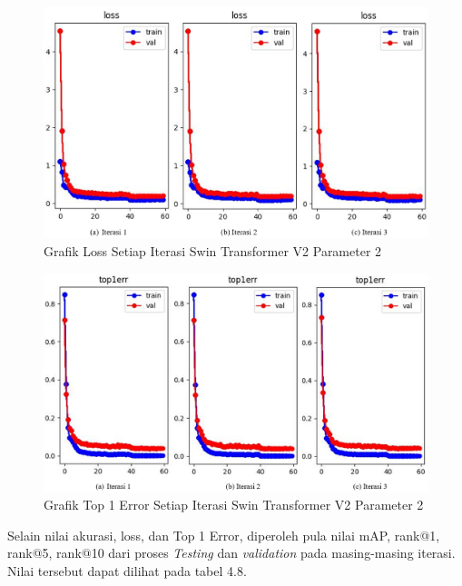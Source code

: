 \begin{figure}[ht]
  \centering
  \includegraphics[scale=0.55]{gambar/Train SwinV2CP1 Loss.png}
  \caption{Grafik Loss Setiap Iterasi Swin Transformer V2 Parameter 2}
  \label{fig:grafiklossdariswinv2parameter2}
\end{figure}

\begin{figure}[ht]
  \centering
  \includegraphics[scale=0.55]{gambar/Train SwinV2CP1 Top1Err.png}
  \caption{Grafik Top 1 Error Setiap Iterasi Swin Transformer V2 Parameter 2}
  \label{fig:grafiktop1errdariswinv2parameter2}
\end{figure}

Selain nilai akurasi, loss, dan Top 1 Error, diperoleh pula nilai mAP, rank@1, 
rank@5, rank@10 dari proses \emph{Testing} dan \emph{validation} pada 
masing-masing iterasi. Nilai tersebut dapat dilihat pada tabel 4.8.\\

